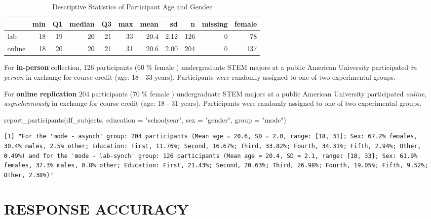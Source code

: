 \documentclass[
  letterpaper,
  DIV=11,
  numbers=noendperiod]{scrreprt}
\newenvironment{Shaded}{\begin{snugshade}}{\end{snugshade}}
\newcommand{\AttributeTok}[1]{\textcolor[rgb]{0.40,0.45,0.13}{#1}}
\newcommand{\FunctionTok}[1]{\textcolor[rgb]{0.28,0.35,0.67}{#1}}
\newcommand{\NormalTok}[1]{\textcolor[rgb]{0.00,0.23,0.31}{#1}}
\newcommand{\StringTok}[1]{\textcolor[rgb]{0.13,0.47,0.30}{#1}}
\begin{document}
\begin{table}

\caption{Descriptive Statistics of Participant Age and Gender}
\centering
\begin{tabular}[t]{l|r|r|r|r|r|r|r|r|r|r}
\hline
  & min & Q1 & median & Q3 & max & mean & sd & n & missing & female\\
\hline
lab & 18 & 19 & 20 & 21 & 33 & 20.4 & 2.12 & 126 & 0 & 78\\
\hline
online & 18 & 20 & 20 & 21 & 31 & 20.6 & 2.00 & 204 & 0 & 137\\
\hline
\end{tabular}
\end{table}

For \textbf{in-person} collection, 126 participants (60 \% female )
undergraduate STEM majors at a public American University participated
\emph{in person} in exchange for course credit (age: 18 - 33 years).
Participants were randomly assigned to one of two experimental groups.

For \textbf{online replication} 204 participants (70 \% female )
undergraduate STEM majors at a public American University participated
\emph{online, asynchronously} in exchange for course credit (age: 18 -
31 years). Participants were randomly assigned to one of two
experimental groups.

\begin{Shaded}
\begin{Highlighting}[]
\FunctionTok{report\_participants}\NormalTok{(df\_subjects, }\AttributeTok{education =} \StringTok{"schoolyear"}\NormalTok{, }\AttributeTok{sex =} \StringTok{"gender"}\NormalTok{, }\AttributeTok{group =} \StringTok{"mode"}\NormalTok{)}
\end{Highlighting}
\end{Shaded}

\begin{verbatim}
[1] "For the 'mode - asynch' group: 204 participants (Mean age = 20.6, SD = 2.0, range: [18, 31]; Sex: 67.2% females, 30.4% males, 2.5% other; Education: First, 11.76%; Second, 16.67%; Third, 33.82%; Fourth, 34.31%; Fifth, 2.94%; Other, 0.49%) and for the 'mode - lab-synch' group: 126 participants (Mean age = 20.4, SD = 2.1, range: [18, 33]; Sex: 61.9% females, 37.3% males, 0.8% other; Education: First, 21.43%; Second, 20.63%; Third, 26.98%; Fourth, 19.05%; Fifth, 9.52%; Other, 2.38%)"
\end{verbatim}

\hypertarget{response-accuracy}{%
\section{RESPONSE ACCURACY}\label{response-accuracy}}
\end{document}
